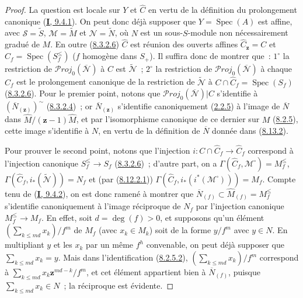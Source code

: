 \begin{proof}
La question est locale sur $Y$ et $\widehat{C}$ en vertu de la définition du
prolongement canonique (\hyperref[I.9.4.1-fr]{\textbf{I}, 9.4.1}). On peut donc déjà
supposer que $Y=\operatorname{Spec}(A)$ est affine, avec
$\mathcal{S}=\widetilde{S}$, $\mathcal{M}=\widetilde{M}$ et
$\mathcal{N}=\widetilde{N}$, où $N$ est un sous-$S$-module non
nécessairement gradué de $M$. En outre
(\hyperref[II.8.3.2.6-fr]{8.3.2.6}) $\widehat{C}$ est réunion des ouverts
affines $\widehat{C}_{\mathbf{z}}=C$ et
$\widehat{C}_f=\operatorname{Spec}(S_f^{\leq})$ ($f$ homogène dans $S_+$).
Il suffira donc de montrer que~: $1^\circ$ la restriction de
$\mathcal{P}\mathit{roj}_0(\overline{\mathcal{N}})$ à $C$ est
$\widetilde{\mathcal{N}}$~; $2^\circ$ la restriction de
$\mathcal{P}\mathit{roj}_0(\overline{\mathcal{N}})$ à chaque $\widehat{C}_f$ est
le prolongement canonique de la restriction de $\widetilde{\mathcal{N}}$ à
$C\cap\widehat{C}_f=\operatorname{Spec}(S_f)$
(\hyperref[II.8.3.2.6-fr]{8.3.2.6}). Pour le premier point, notons que
$\mathcal{P}\mathit{roj}_0(\overline{\mathcal{N}})|C$ s'identifie à
$(\overline{N}_{(\mathbf{z})})^{\sim}$
(\hyperref[II.8.3.2.4-fr]{8.3.2.4})~; or $\overline{N}_{(\mathbf{z})}$ s'identifie
canoniquement (\hyperref[II.2.2.5-fr]{2.2.5}) à l'image de
$\overline{N}$ dans $\widehat{M}/(\mathbf{z}-1)\widehat{M}$, et par l'isomorphisme
canonique de ce dernier sur $M$ (\hyperref[II.8.2.5-fr]{8.2.5}), cette image
s'identifie à $N$, en vertu de la définition de $\overline{N}$ donnée dans
(\hyperref[II.8.13.2-fr]{8.13.2}).

Pour prouver le second point, notons que l'injection
$i:C\cap\widehat{C}_f\to\widehat{C}_f$ correspond à l'injection canonique
$S_f^{\leq}\to S_f$ (\hyperref[II.8.3.2.6-fr]{8.3.2.6})~; d'autre part, on
a $\Gamma(\widehat{C}_f,\mathcal{M}^{\square})=M_f^{\leq}$,
$\Gamma(\widehat{C}_f,i_*(\widetilde{\mathcal{N}}))=N_f$ et (par
(\hyperref[II.8.12.2.1-fr]{8.12.2.1}))
$\Gamma(\widehat{C}_f,i_*(i^*(\mathcal{M}^{\square})))=M_f$. Compte tenu de
(\hyperref[I.9.4.2-fr]{\textbf{I}, 9.4.2}), on est donc ramené à montrer que
$\overline{N}_{(f)}\subset\widehat{M}_{(f)}=M_f^{\leq}$ s'identifie
canoniquement à l'image réciproque de $N_f$ par l'injection canonique
$M_f^{\leq}\to M_f$. En effet, soit $d=\deg(f)>0$, et supposons qu'un
élément $(\sum_{k\leqslant md}x_k)/f^m$ de $M_f$ (avec $x_k\in M_k$) soit de
la forme $y/f^m$ avec $y\in N$. En multipliant $y$ et les $x_k$ par un même
$f^h$ convenable, on peut déjà supposer que $\sum_{k\leqslant md}x_k=y$.
Mais dans l'identification (\hyperref[II.8.2.5.2-fr]{8.2.5.2}),
$(\sum_{k\leqslant md}x_k)/f^m$ correspond à
$\sum_{k\leqslant md}x_k\mathbf{z}^{md-k}/f^m$, et cet élément appartient bien à
$\overline{N}_{(f)}$, puisque $\sum_{k\leqslant md}x_k\in N$~; la réciproque
est évidente.
\end{proof}

